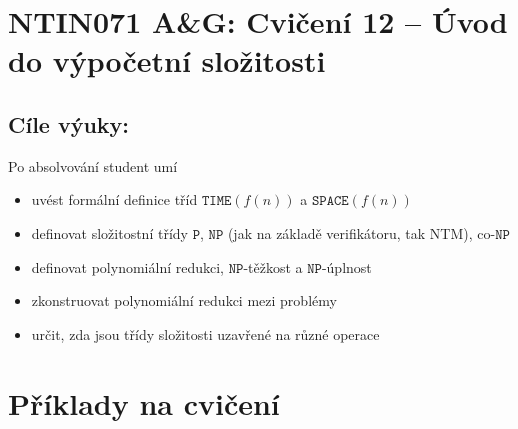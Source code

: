 \documentclass[a4paper,12pt]{amsart}
\begin{document}
\thispagestyle{empty}

\section*{NTIN071 A\&G: Cvičení 12 -- Úvod do výpočetní složitosti}

\medskip

\subsection*{Cíle výuky:} Po absolvování student umí

\begin{itemize}\setlength{\itemsep}{0pt}
    \item uvést formální definice tříd $\mathtt{TIME}(f(n))$ a $\mathtt{SPACE}(f(n))$
    \item definovat složitostní třídy $\mathtt{P}$, $\mathtt{NP}$ (jak na základě verifikátoru, tak NTM), co-$\mathtt{NP}$
    \item definovat polynomiální redukci, $\mathtt{NP}$-těžkost a $\mathtt{NP}$-úplnost
    \item zkonstruovat polynomiální redukci mezi problémy
    \item určit, zda jsou třídy složitosti uzavřené na různé operace
\end{itemize}


\section*{Příklady na cvičení}
\end{document}
